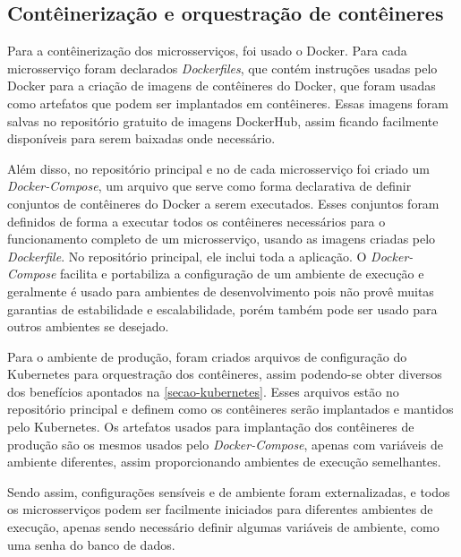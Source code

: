 \subsection*{Contêinerização e orquestração de contêineres}
Para a contêinerização dos microsserviços, foi usado o Docker. Para cada microsserviço foram declarados \emph{Dockerfiles}, que contém instruções usadas pelo Docker para a criação de imagens de contêineres do Docker, que foram usadas como artefatos que podem ser implantados em contêineres. Essas imagens foram salvas no repositório gratuito de imagens DockerHub, assim ficando facilmente disponíveis para serem baixadas onde necessário.

Além disso, no repositório principal e no de cada microsserviço foi criado um \emph{Docker-Compose}, um arquivo que serve como forma declarativa de definir conjuntos de contêineres do Docker a serem executados. Esses conjuntos foram definidos de forma a executar todos os contêineres necessários para o funcionamento completo de um microsserviço, usando as imagens criadas pelo \emph{Dockerfile}. No repositório principal, ele inclui toda a aplicação. O \emph{Docker-Compose} facilita e portabiliza a configuração de um ambiente de execução e geralmente é usado para ambientes de desenvolvimento pois não provê muitas garantias de estabilidade e escalabilidade, porém também pode ser usado para outros ambientes se desejado.

Para o ambiente de produção, foram criados arquivos de configuração do Kubernetes para orquestração dos contêineres, assim podendo-se obter diversos dos benefícios apontados na \autoref{secao-kubernetes}. Esses arquivos estão no repositório principal e definem como os contêineres serão implantados e mantidos pelo Kubernetes. Os artefatos usados para implantação dos contêineres de produção são os mesmos usados pelo \emph{Docker-Compose}, apenas com variáveis de ambiente diferentes, assim proporcionando ambientes de execução semelhantes.


Sendo assim, configurações sensíveis e de ambiente foram externalizadas, e todos os microsserviços podem ser facilmente iniciados para diferentes ambientes de execução, apenas sendo necessário definir algumas variáveis de ambiente, como uma senha do banco de dados.


